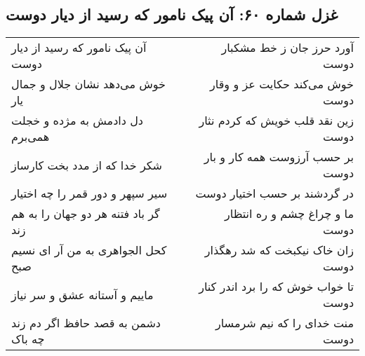 \begin{center}
\section*{غزل شماره ۶۰: آن پیک نامور که رسید از دیار دوست}
\label{sec:sh060}
\begin{longtable}{l p{0.5cm} r}
آن پیک نامور که رسید از دیار دوست
&&
آورد حرز جان ز خط مشکبار دوست
\\
خوش می‌دهد نشان جلال و جمال یار
&&
خوش می‌کند حکایت عز و وقار دوست
\\
دل دادمش به مژده و خجلت همی‌برم
&&
زین نقد قلب خویش که کردم نثار دوست
\\
شکر خدا که از مدد بخت کارساز
&&
بر حسب آرزوست همه کار و بار دوست
\\
سیر سپهر و دور قمر را چه اختیار
&&
در گردشند بر حسب اختیار دوست
\\
گر باد فتنه هر دو جهان را به هم زند
&&
ما و چراغ چشم و ره انتظار دوست
\\
کحل الجواهری به من آر ای نسیم صبح
&&
زان خاک نیکبخت که شد رهگذار دوست
\\
ماییم و آستانه عشق و سر نیاز
&&
تا خواب خوش که را برد اندر کنار دوست
\\
دشمن به قصد حافظ اگر دم زند چه باک
&&
منت خدای را که نیم شرمسار دوست
\\
\end{longtable}
\end{center}

